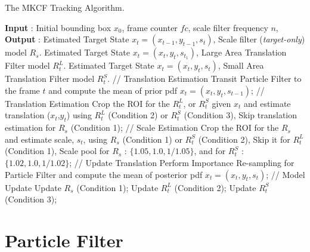 \documentclass[10pt,twocolumn,letterpaper]{article}
\newcounter{ct}
\begin{document}
\begin{algorithm}
	\caption{The MKCF Tracking Algorithm.}\label{alg:MKCF}
	\begin{algorithmic}[1]
	\State \textbf{Input} : Initial bounding box $x_{0}$, frame counter $fc$, scale filter frequency $n$,
	\State \textbf{Output} : 
								 
										\State Estimated Target State $x_{t} = (x_{t-1},y_{t-1},s_{t})$,
										Scale filter (\textit{target-only}) model $R_{s}$.
								     \EndIf
										\State Estimated Target State $x_{t} = (x_{t},y_{t},s_{t_1})$,
										Large Area Translation Filter model $R_{t}^{L}$.
								     \EndIf
										\State Estimated Target State $x_{t} = (x_{t},y_{t},s_{t})$,
										Small Area Translation Filter model $R_{t}^{S}$.
								     \EndIf
								 \State // Translation Estimation
								 \State Transit Particle Filter to the frame $t$ and compute the mean of prior pdf $x_{t} = (x_{t},y_{t},s_{t-1})$;
								 \State // Translation Estimation
								 \State Crop the ROI for the $R_{t}^{L}$, or $R_{t}^{S}$ given $x_{t}$
								 and estimate translation ($x_{t}$,$y_{t}$) using $R_{t}^{L}$ (Condition 2) or $R_{t}^{S}$ (Condition 3),
								 \State Skip translation estimation for $R_{s}$ (Condition 1);
								 \State // Scale Estimation
								 \State Crop the ROI for the $R_{s}$ and estimate scale, $s_{t}$, using $R_{s}$ (Condition 1) or $R_{t}^{S}$ (Condition 2), 
								 \State Skip it for $R_{t}^{L}$ (Condition 1),
								 \State Scale pool for $R_{s}$ : $\lbrace1.05,1.0,1/1.05\rbrace$, and for $R_{t}^{S}$ : $\lbrace1.02,1.0,1/1.02\rbrace$;
								 \State // Update Translation
								 \State Perform Importance Re-sampling for Particle Filter and compute the mean of posterior pdf $x_{t} = (x_{t},y_{t},s_{t})$;
								 \State // Model Update
								 	\State Update $R_{s}$ (Condition 1);
								 \EndIf							 
								 	\State Update $R_{t}^{L}$ (Condition 2);
								 \EndIf	
								 	\State Update $R_{t}^{S}$ (Condition 3);
								 \EndIf		
	\EndProcedure	
	\end{algorithmic}
\end{algorithm}

\section{Particle Filter}
\label{sc:PF}
\end{document}

